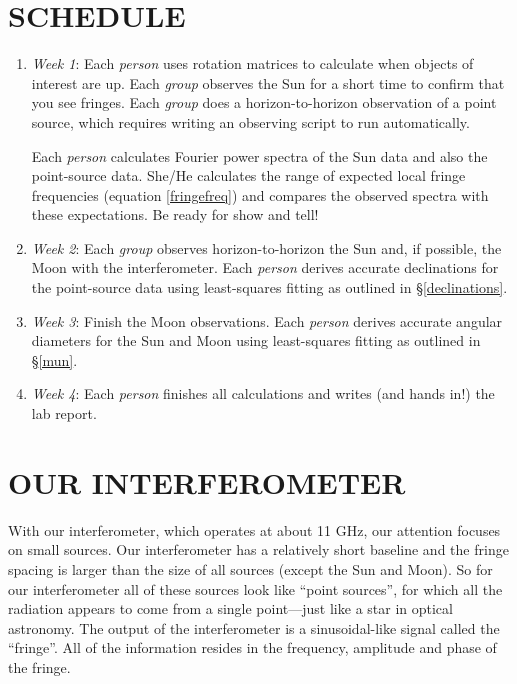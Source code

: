 \documentclass[11pt,preprint]{aastex}
\begin{document}
\section{SCHEDULE}

\begin{enumerate}

\item {\it Week 1}: Each {\it person} uses rotation matrices to
calculate when objects of interest are up. Each {\it group} observes the
Sun for a short time to confirm that you see fringes. Each {\it group}
does a horizon-to-horizon observation of a point source, which requires
writing an observing script to run automatically.

Each {\it person} calculates Fourier power spectra of the Sun data and
also the point-source data. She/He calculates the range of expected
local fringe frequencies (equation \ref{fringefreq}) and compares the
observed spectra with these expectations. Be ready for show and tell!

\item {\it Week 2}: Each {\it group} observes horizon-to-horizon the Sun
  and, if possible, the Moon with the interferometer.  Each {\it person}
  derives accurate declinations for the point-source data using
  least-squares fitting as outlined in \S \ref{declinations}.

\item {\it Week 3}: Finish the Moon observations. Each {\it person}
  derives accurate angular diameters for the Sun and Moon using
  least-squares fitting as outlined in \S \ref{mun}. 

\item {\it Week 4}: Each {\it person} finishes all calculations and
writes (and hands in!) the lab report.

\end{enumerate}

\section{OUR INTERFEROMETER}

	With our interferometer, which operates at about 11 GHz, our
attention focuses on small sources.  Our interferometer has a relatively
short baseline and the fringe spacing is larger than the size of all
sources (except the Sun and Moon).  So for our interferometer all of
these sources look like ``point sources'', for which all the radiation
appears to come from a single point---just like a star in optical
astronomy.  The output of the interferometer is a sinusoidal-like signal
called the ``fringe''. All of the information resides in the frequency,
amplitude and phase of the fringe.
\end{document}
